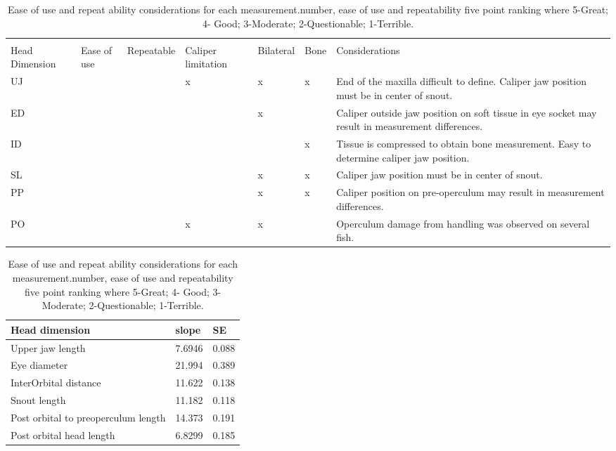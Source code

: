 \documentclass[12pt]{article}\usepackage[]{graphicx}\usepackage[]{color}
\begin{document}
\begin{table}

\caption{\label{tab:table5}Ease of use and repeat ability considerations for each measurement.number, ease of use and repeatability five point ranking where 5-Great; 4- Good; 3-Moderate; 2-Questionable; 1-Terrible.}
\fontsize{10}{12}\selectfont
\begin{tabular}[t]{>{\raggedright\arraybackslash}p{1.0cm}>{\raggedleft\arraybackslash}p{0.6cm}>{\raggedleft\arraybackslash}p{1.7cm}>{\raggedright\arraybackslash}p{1.2cm}>{\raggedright\arraybackslash}p{1.7cm}>{\raggedright\arraybackslash}p{1.7cm}>{\raggedright\arraybackslash}p{4.2cm}}
\toprule
\multicolumn{1}{c}{\textbf{ }} & \multicolumn{2}{c}{\textbf{5 Point}} & \multicolumn{1}{c}{\textbf{ }} & \multicolumn{2}{c}{\textbf{Measurement}} & \multicolumn{1}{c}{\textbf{ }} \\
\cmidrule(l{3pt}r{3pt}){2-3} \cmidrule(l{3pt}r{3pt}){5-6}
Head Dimension & Ease of use & Repeatable & Caliper limitation & Bilateral & Bone & Considerations\\
\midrule
UJ & 3 & 4 & x & x & x & End of the maxilla difficult to define. Caliper jaw position must be in center of snout.\\
\midrule
ED & 3 & 2 &  & x &  & Caliper outside jaw position on soft tissue in eye socket may result in measurement differences.\\
\midrule
ID & 5 & 5 &  &  & x & Tissue is compressed to obtain bone measurement. Easy to determine caliper jaw position.\\
\midrule
SL & 4 & 5 &  & x & x & Caliper jaw position must be in center of snout.\\
\midrule
PP & 4 & 5 &  & x & x & Caliper position on pre-operculum may result in measurement differences.\\
\midrule
PO & 3 & 2 & x & x &  & Operculum damage from handling was observed on several fish.\\
\bottomrule
\end{tabular}
\end{table}

\begin{table}

\caption{\label{tab:table6}Ease of use and repeat ability considerations for each measurement.number, ease of use and repeatability five point ranking where 5-Great; 4- Good; 3-Moderate; 2-Questionable; 1-Terrible.}
\fontsize{10}{12}\selectfont
\begin{tabular}[t]{lll}
\toprule
\textbf{Head dimension} & \textbf{slope} & \textbf{SE}\\
\midrule
Upper jaw length & 7.6946 & 0.088\\
Eye diameter & 21.994 & 0.389\\
InterOrbital distance & 11.622 & 0.138\\
Snout length & 11.182 & 0.118\\
Post orbital to preoperculum length & 14.373 & 0.191\\
Post orbital head length & 6.8299 & 0.185\\
\bottomrule
\end{tabular}
\end{table}
\clearpage
\end{document}
